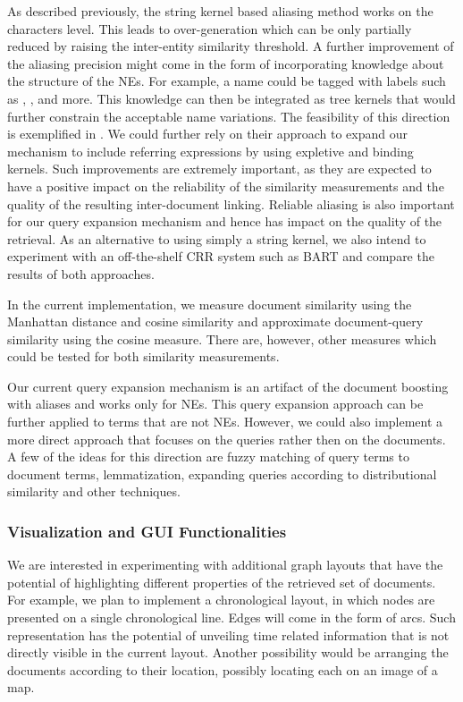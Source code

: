 As described previously, the string kernel based aliasing method works on the characters level. 
This leads to over-generation which can be only partially reduced by raising the inter-entity similarity threshold.   
A further improvement of the aliasing precision might come in the form of incorporating knowledge about the structure of the NEs. 
For example, a name could be tagged
with labels such as , ,  and more. This knowledge can then be integrated as tree kernels
that would further constrain the acceptable name variations. The feasibility of this direction is exemplified in \cite{string_kernel_coref}.
We could further rely on their approach to expand our mechanism to include referring expressions by using expletive and binding kernels.
Such improvements are extremely important, as they are expected to have a positive impact on the reliability of the similarity measurements and
the quality of the resulting inter-document linking. 
Reliable aliasing is also important for our query expansion mechanism and hence has impact on the quality of the retrieval.
As an alternative to using simply a string kernel, we also intend to experiment with an off-the-shelf CRR system such as 
BART and compare the results of both approaches. 

In the current implementation, we measure document similarity using the Manhattan distance and cosine similarity and approximate document-query similarity 
using the cosine measure. There are, however, other measures which could be tested for both similarity measurements. 

Our current query expansion mechanism is an artifact of the document boosting with aliases and works only for NEs. This query expansion approach can be further applied to terms that are not NEs. However, we could also implement a more direct approach that focuses on the queries rather then on the documents. A few of the ideas for this direction are fuzzy matching of query terms to document terms, lemmatization, expanding queries according to distributional similarity and other techniques. 



\subsubsection{Visualization and GUI Functionalities}

We are interested in experimenting with additional graph layouts that have the potential of highlighting different properties of the 
retrieved set of documents. For example, we plan to implement a chronological layout, in which nodes are presented on a single chronological 
line. Edges will come in the form of arcs. Such representation has the potential of unveiling time related information that is not 
directly visible in the current layout. Another possibility would be arranging the documents according to their location, possibly locating each on an image of a map. 

